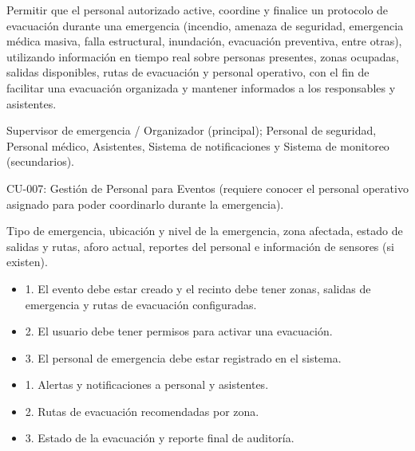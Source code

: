 \begin{description}[leftmargin=!, labelwidth=3.4cm, style=nextline, topsep=3pt]
\item[Objetivo] Permitir que el personal autorizado active, coordine y finalice un protocolo de evacuación durante una emergencia (incendio, amenaza de seguridad, emergencia médica masiva, falla estructural, inundación, evacuación preventiva, entre otras), utilizando información en tiempo real sobre personas presentes, zonas ocupadas, salidas disponibles, rutas de evacuación y personal operativo, con el fin de facilitar una evacuación organizada y mantener informados a los responsables y asistentes.

\item[Actores] Supervisor de emergencia / Organizador (principal); Personal de seguridad, Personal médico, Asistentes, Sistema de notificaciones y Sistema de monitoreo (secundarios).

\item[CU relacionados] CU-007: Gestión de Personal para Eventos (requiere conocer el personal operativo asignado para poder coordinarlo durante la emergencia).

\item[Entradas] Tipo de emergencia, ubicación y nivel de la emergencia, zona afectada, estado de salidas y rutas, aforo actual, reportes del personal e información de sensores (si existen).

\item[Pre-condiciones] \hfill
\begin{itemize}[leftmargin=1.2em, topsep=1pt]
  \item 1. El evento debe estar creado y el recinto debe tener zonas, salidas de emergencia y rutas de evacuación configuradas.
  \item 2. El usuario debe tener permisos para activar una evacuación.
  \item 3. El personal de emergencia debe estar registrado en el sistema.
\end{itemize}

\item[Salidas] \hfill
\begin{itemize}[leftmargin=1.2em, topsep=1pt]
  \item 1. Alertas y notificaciones a personal y asistentes.
  \item 2. Rutas de evacuación recomendadas por zona.
  \item 3. Estado de la evacuación y reporte final de auditoría.
\end{itemize}


\end{description}
